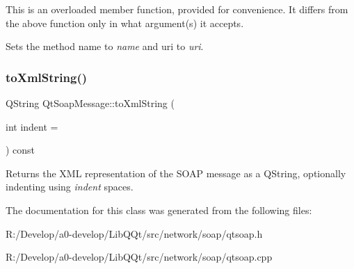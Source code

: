 This is an overloaded member function, provided for convenience. It differs from the above function only in what argument(s) it accepts.

Sets the method name to {\itshape name} and uri to {\itshape uri}. \mbox{\label{class_qt_soap_message_a5c9c6997f2ee1b35bf73a7988ef87213}} 
\subsubsection{\texorpdfstring{to\+Xml\+String()}{toXmlString()}}
{\footnotesize\ttfamily Q\+String Qt\+Soap\+Message\+::to\+Xml\+String (\begin{DoxyParamCaption}\item[{int}]{indent = {} }\end{DoxyParamCaption}) const}

Returns the X\+ML representation of the S\+O\+AP message as a Q\+String, optionally indenting using {\itshape indent} spaces. 

The documentation for this class was generated from the following files\+:\begin{DoxyCompactItemize}
\item 
R\+:/\+Develop/a0-\/develop/\+Lib\+Q\+Qt/src/network/soap/qtsoap.\+h\item 
R\+:/\+Develop/a0-\/develop/\+Lib\+Q\+Qt/src/network/soap/qtsoap.\+cpp\end{DoxyCompactItemize}
